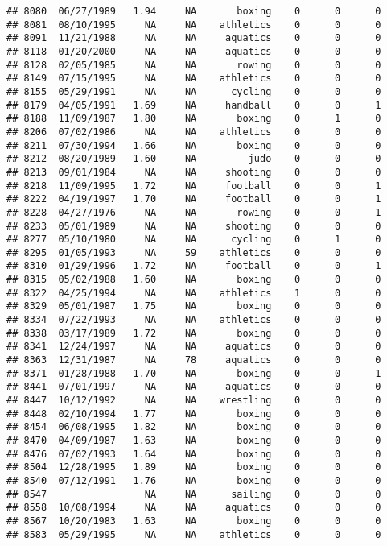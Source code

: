 \documentclass[]{article}
\begin{document}
\begin{verbatim}
## 8080  06/27/1989   1.94     NA       boxing    0      0      0
## 8081  08/10/1995     NA     NA    athletics    0      0      0
## 8091  11/21/1988     NA     NA     aquatics    0      0      0
## 8118  01/20/2000     NA     NA     aquatics    0      0      0
## 8128  02/05/1985     NA     NA       rowing    0      0      0
## 8149  07/15/1995     NA     NA    athletics    0      0      0
## 8155  05/29/1991     NA     NA      cycling    0      0      0
## 8179  04/05/1991   1.69     NA     handball    0      0      1
## 8188  11/09/1987   1.80     NA       boxing    0      1      0
## 8206  07/02/1986     NA     NA    athletics    0      0      0
## 8211  07/30/1994   1.66     NA       boxing    0      0      0
## 8212  08/20/1989   1.60     NA         judo    0      0      0
## 8213  09/01/1984     NA     NA     shooting    0      0      0
## 8218  11/09/1995   1.72     NA     football    0      0      1
## 8222  04/19/1997   1.70     NA     football    0      0      1
## 8228  04/27/1976     NA     NA       rowing    0      0      1
## 8233  05/01/1989     NA     NA     shooting    0      0      0
## 8277  05/10/1980     NA     NA      cycling    0      1      0
## 8295  01/05/1993     NA     59    athletics    0      0      0
## 8310  01/29/1996   1.72     NA     football    0      0      1
## 8315  05/02/1988   1.60     NA       boxing    0      0      0
## 8322  04/25/1994     NA     NA    athletics    1      0      0
## 8329  05/01/1987   1.75     NA       boxing    0      0      0
## 8334  07/22/1993     NA     NA    athletics    0      0      0
## 8338  03/17/1989   1.72     NA       boxing    0      0      0
## 8341  12/24/1997     NA     NA     aquatics    0      0      0
## 8363  12/31/1987     NA     78     aquatics    0      0      0
## 8371  01/28/1988   1.70     NA       boxing    0      0      1
## 8441  07/01/1997     NA     NA     aquatics    0      0      0
## 8447  10/12/1992     NA     NA    wrestling    0      0      0
## 8448  02/10/1994   1.77     NA       boxing    0      0      0
## 8454  06/08/1995   1.82     NA       boxing    0      0      0
## 8470  04/09/1987   1.63     NA       boxing    0      0      0
## 8476  07/02/1993   1.64     NA       boxing    0      0      0
## 8504  12/28/1995   1.89     NA       boxing    0      0      0
## 8540  07/12/1991   1.76     NA       boxing    0      0      0
## 8547                 NA     NA      sailing    0      0      0
## 8558  10/08/1994     NA     NA     aquatics    0      0      0
## 8567  10/20/1983   1.63     NA       boxing    0      0      0
## 8583  05/29/1995     NA     NA    athletics    0      0      0

\end{verbatim}
\end{document}

